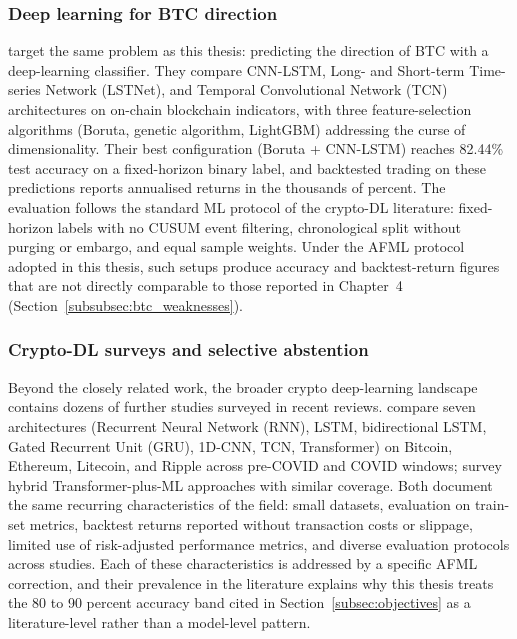 \subsubsection{Deep learning for BTC direction}\label{subsubsec:btc_dl}

\citet{omole_enke_2024} target the same problem as this thesis: predicting the direction of BTC with a deep-learning classifier. They compare CNN-LSTM, Long- and Short-term Time-series Network (LSTNet), and Temporal Convolutional Network (TCN) architectures on on-chain blockchain indicators, with three feature-selection algorithms (Boruta, genetic algorithm, LightGBM) addressing the curse of dimensionality. Their best configuration (Boruta + CNN-LSTM) reaches 82.44\% test accuracy on a fixed-horizon binary label, and backtested trading on these predictions reports annualised returns in the thousands of percent. The evaluation follows the standard ML protocol of the crypto-DL literature: fixed-horizon labels with no CUSUM event filtering, chronological split without purging or embargo, and equal sample weights. Under the AFML protocol adopted in this thesis, such setups produce accuracy and backtest-return figures that are not directly comparable to those reported in Chapter~4 (Section~\ref{subsubsec:btc_weaknesses}).


\subsubsection{Crypto-DL surveys and selective abstention}\label{subsubsec:btc_dl_landscape}

Beyond the closely related work, the broader crypto deep-learning landscape contains dozens of further studies surveyed in recent reviews. \citet{wu_crypto_dl_review_2024} compare seven architectures (Recurrent Neural Network (RNN), LSTM, bidirectional LSTM, Gated Recurrent Unit (GRU), 1D-CNN, TCN, Transformer) on Bitcoin, Ethereum, Litecoin, and Ripple across pre-COVID and COVID windows; \citet{bourday_crypto_dl_2024} survey hybrid Transformer-plus-ML approaches with similar coverage. Both document the same recurring characteristics of the field: small datasets, evaluation on train-set metrics, backtest returns reported without transaction costs or slippage, limited use of risk-adjusted performance metrics, and diverse evaluation protocols across studies. Each of these characteristics is addressed by a specific AFML correction, and their prevalence in the literature explains why this thesis treats the 80 to 90 percent accuracy band cited in Section~\ref{subsec:objectives} as a literature-level rather than a model-level pattern.

